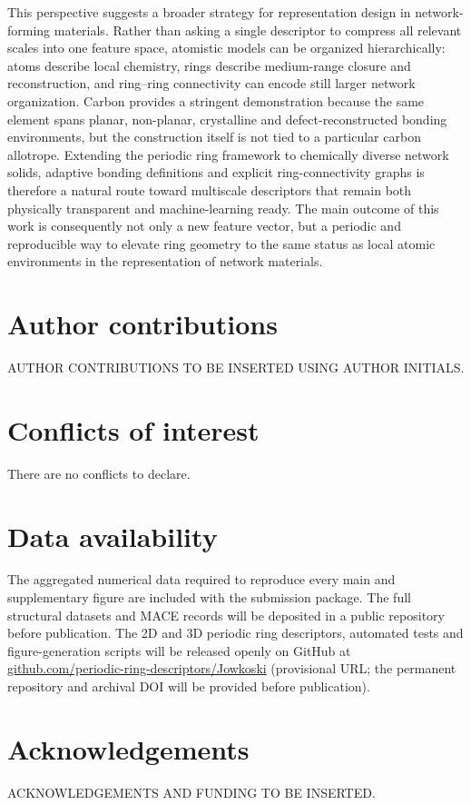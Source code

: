 \documentclass[twoside,twocolumn,9pt]{article}
\begin{document}
This perspective suggests a broader strategy for representation design in network-forming materials. Rather than asking a single descriptor to compress all relevant scales into one feature space, atomistic models can be organized hierarchically: atoms describe local chemistry, rings describe medium-range closure and reconstruction, and ring--ring connectivity can encode still larger network organization. Carbon provides a stringent demonstration because the same element spans planar, non-planar, crystalline and defect-reconstructed bonding environments, but the construction itself is not tied to a particular carbon allotrope. Extending the periodic ring framework to chemically diverse network solids, adaptive bonding definitions and explicit ring-connectivity graphs is therefore a natural route toward multiscale descriptors that remain both physically transparent and machine-learning ready. The main outcome of this work is consequently not only a new feature vector, but a periodic and reproducible way to elevate ring geometry to the same status as local atomic environments in the representation of network materials.

\section*{Author contributions}
AUTHOR CONTRIBUTIONS TO BE INSERTED USING AUTHOR INITIALS.


\section*{Conflicts of interest}
There are no conflicts to declare.


\section*{Data availability}
The aggregated numerical data required to reproduce every main and supplementary figure are included with the submission package. The full structural datasets and MACE records will be deposited in a public repository before publication. The 2D and 3D periodic ring descriptors, automated tests and figure-generation scripts will be released openly on GitHub at \href{https://github.com/periodic-ring-descriptors/Jowkoski}{github.com/periodic-ring-descriptors/Jowkoski} (provisional URL; the permanent repository and archival DOI will be provided before publication).



\section*{Acknowledgements}
ACKNOWLEDGEMENTS AND FUNDING TO BE INSERTED.



\balance


\end{document}
